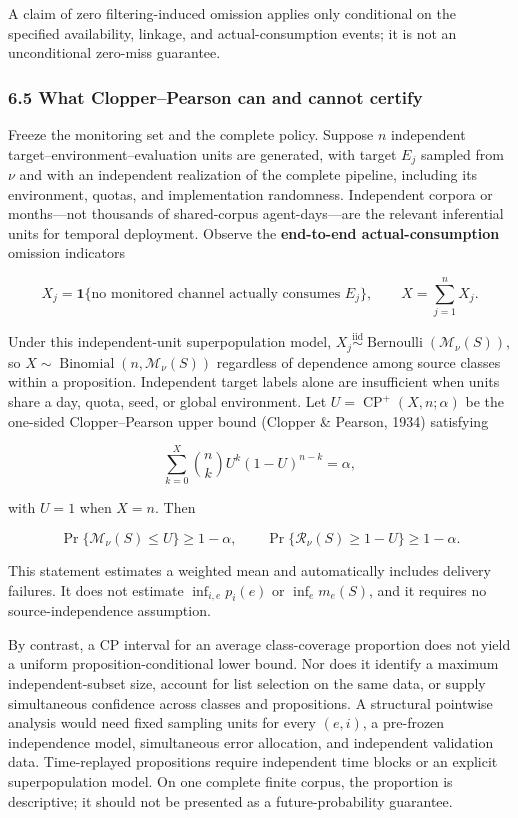 \documentclass[
  11pt]{article}
\begin{document}
A claim of zero filtering-induced omission applies only conditional on
the specified availability, linkage, and actual-consumption events; it
is not an unconditional zero-miss guarantee.

\subsubsection{6.5 What Clopper--Pearson can and cannot
certify}\label{what-clopperpearson-can-and-cannot-certify}

Freeze the monitoring set and the complete policy. Suppose \(n\)
independent target--environment--evaluation units are generated, with
target \(E_j\) sampled from \(\nu\) and with an independent realization
of the complete pipeline, including its environment, quotas, and
implementation randomness. Independent corpora or months---not thousands
of shared-corpus agent-days---are the relevant inferential units for
temporal deployment. Observe the \textbf{end-to-end actual-consumption}
omission indicators

\[X_j=\mathbf 1\{\text{no monitored channel actually consumes }E_j\},\qquad X=\sum_{j=1}^nX_j.\]

Under this independent-unit superpopulation model,
\(X_j\overset{\mathrm{iid}}{\sim}\operatorname{Bernoulli}(\mathcal M_\nu(S))\),
so \(X\sim\operatorname{Binomial}(n,\mathcal M_\nu(S))\) regardless of
dependence among source classes within a proposition. Independent target
labels alone are insufficient when units share a day, quota, seed, or
global environment. Let \(U=\operatorname{CP}^+(X,n;\alpha)\) be the
one-sided Clopper--Pearson upper bound (Clopper \& Pearson, 1934)
satisfying

\[\sum_{k=0}^{X}\binom nk U^k(1-U)^{n-k}=\alpha,\]

with \(U=1\) when \(X=n\). Then

\[\Pr\{\mathcal M_\nu(S)\le U\}\ge1-\alpha,\qquad
\Pr\{\mathcal R_\nu(S)\ge1-U\}\ge1-\alpha.\tag{9}\]

This statement estimates a weighted mean and automatically includes
delivery failures. It does not estimate \(\inf_{i,e}p_i(e)\) or
\(\inf_e m_e(S)\), and it requires no source-independence assumption.

By contrast, a CP interval for an average class-coverage proportion does
not yield a uniform proposition-conditional lower bound. Nor does it
identify a maximum independent-subset size, account for list selection
on the same data, or supply simultaneous confidence across classes and
propositions. A structural pointwise analysis would need fixed sampling
units for every \((e,i)\), a pre-frozen independence model, simultaneous
error allocation, and independent validation data. Time-replayed
propositions require independent time blocks or an explicit
superpopulation model. On one complete finite corpus, the proportion is
descriptive; it should not be presented as a future-probability
guarantee.
\end{document}
